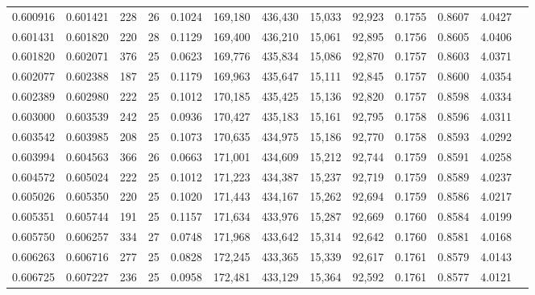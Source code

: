 \begin{tabular}{rrrrrrrrrrrrr}
0.600916 & 0.601421 &   228 &  26 &                                     0.1024 & 169,180 & 436,430 &  15,033 &  92,923 & 0.1755 & 0.8607 & 4.0427 \\
0.601431 & 0.601820 &   220 &  28 &                                     0.1129 & 169,400 & 436,210 &  15,061 &  92,895 & 0.1756 & 0.8605 & 4.0406 \\
0.601820 & 0.602071 &   376 &  25 &                                     0.0623 & 169,776 & 435,834 &  15,086 &  92,870 & 0.1757 & 0.8603 & 4.0371 \\
0.602077 & 0.602388 &   187 &  25 &                                     0.1179 & 169,963 & 435,647 &  15,111 &  92,845 & 0.1757 & 0.8600 & 4.0354 \\
0.602389 & 0.602980 &   222 &  25 &                                     0.1012 & 170,185 & 435,425 &  15,136 &  92,820 & 0.1757 & 0.8598 & 4.0334 \\
0.603000 & 0.603539 &   242 &  25 &                                     0.0936 & 170,427 & 435,183 &  15,161 &  92,795 & 0.1758 & 0.8596 & 4.0311 \\
0.603542 & 0.603985 &   208 &  25 &                                     0.1073 & 170,635 & 434,975 &  15,186 &  92,770 & 0.1758 & 0.8593 & 4.0292 \\
0.603994 & 0.604563 &   366 &  26 &                                     0.0663 & 171,001 & 434,609 &  15,212 &  92,744 & 0.1759 & 0.8591 & 4.0258 \\
0.604572 & 0.605024 &   222 &  25 &                                     0.1012 & 171,223 & 434,387 &  15,237 &  92,719 & 0.1759 & 0.8589 & 4.0237 \\
0.605026 & 0.605350 &   220 &  25 &                                     0.1020 & 171,443 & 434,167 &  15,262 &  92,694 & 0.1759 & 0.8586 & 4.0217 \\
0.605351 & 0.605744 &   191 &  25 &                                     0.1157 & 171,634 & 433,976 &  15,287 &  92,669 & 0.1760 & 0.8584 & 4.0199 \\
0.605750 & 0.606257 &   334 &  27 &                                     0.0748 & 171,968 & 433,642 &  15,314 &  92,642 & 0.1760 & 0.8581 & 4.0168 \\
0.606263 & 0.606716 &   277 &  25 &                                     0.0828 & 172,245 & 433,365 &  15,339 &  92,617 & 0.1761 & 0.8579 & 4.0143 \\
0.606725 & 0.607227 &   236 &  25 &                                     0.0958 & 172,481 & 433,129 &  15,364 &  92,592 & 0.1761 & 0.8577 & 4.0121 \\

\end{tabular}

